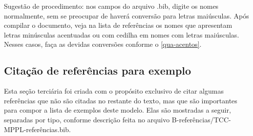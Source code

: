 Sugestão de procedimento: nos campos do arquivo .bib, digite os nomes normalmente, sem se preocupar de haverá conversão para letras maiúsculas. Após compilar o documento, veja na lista de referências os nomes que apresentam letras minúsculas acentuadas ou com cedilha em nomes com letras maiúsculas. Nesses casos, faça as devidas conversões conforme o \autoref{qua-acentos}.

\subsection{Citação de referências para exemplo}

Esta seção terciária foi criada com o propósito exclusivo de citar algumas referências que não são citadas no restante do texto, mas que são importantes para compor a lista de exemplos deste modelo. Elas são mostradas a seguir, separadas por tipo, conforme descrição feita no arquivo \textsf{B-referências/TCC-MPPL-referências.bib}.

